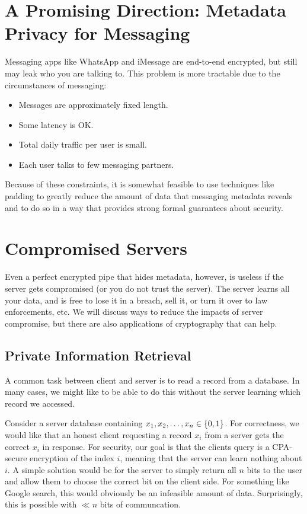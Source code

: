 \section{A Promising Direction: Metadata Privacy for Messaging}
Messaging apps like WhatsApp and iMessage are end-to-end encrypted, but still may leak who you are talking to. This problem is more tractable due to the circumstances of messaging:

\begin{itemize}
	\item Messages are approximately fixed length.
	\item Some latency is OK.
	\item Total daily traffic per user is small.
	\item Each user talks to few messaging partners.
\end{itemize}

Because of these constraints, it is somewhat feasible to use techniques like padding to greatly reduce the amount of data that messaging metadata reveals and to do so in a way that provides strong formal guarantees about security.

\section{Compromised Servers}
Even a perfect encrypted pipe that hides metadata, however, is useless if the server gets compromised (or you do not trust the server). The server learns all your data, and is free to lose it in a breach, sell it, or turn it over to law enforcements, etc. We will discuss ways to reduce the impacts of server compromise, but there are also applications of cryptography that can help.

\subsection{Private Information Retrieval}
A common task between client and server is to read a record from a database. In many cases, we might like to be able to do this without the server learning which record we accessed.

Consider a server database containing $x_1, x_2, \ldots, x_n \in \{0,1\}$. For correctness, we would like that an honest client requesting a record $x_i$ from a server gets the correct $x_i$ in response. For security, our goal is that the clients query is a CPA-secure encryption of the index $i$, meaning that the server can learn nothing about $i$. A simple solution would be for the server to simply return all $n$ bits to the user and allow them to choose the correct bit on the client side. For something like Google search, this would obviously be an infeasible amount of data. Surprisingly, this is possible with $\ll n$ bits of communcation.

